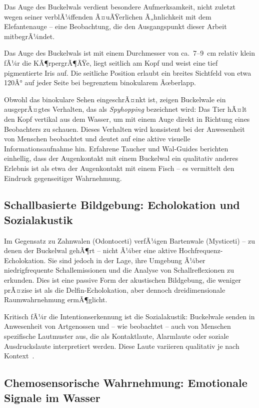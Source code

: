 ﻿\documentclass[12pt,a4paper]{article}
\theoremstyle{definition}
\theoremstyle{remark}
\begin{document}
Das Auge des Buckelwals verdient besondere Aufmerksamkeit, nicht zuletzt wegen
seiner verblÃ¼ffenden Ã¤uÃŸerlichen Ã„hnlichkeit mit dem Elefantenauge -- eine
Beobachtung, die den Ausgangspunkt dieser Arbeit mitbegrÃ¼ndet.

Das Auge des Buckelwals ist mit einem Durchmesser von ca.\ 7--9~cm relativ klein
fÃ¼r die KÃ¶rpergrÃ¶ÃŸe, liegt seitlich am Kopf und weist eine tief pigmentierte
Iris auf. Die seitliche Position erlaubt ein breites Sichtfeld von etwa 120Â°
auf jeder Seite bei begrenztem binokularem Ãœberlapp.

Obwohl das binokulare Sehen eingeschrÃ¤nkt ist, zeigen Buckelwale ein
ausgeprÃ¤gtes Verhalten, das als \emph{Spyhopping} bezeichnet wird: Das
Tier hÃ¤lt den Kopf vertikal aus dem Wasser, um mit einem Auge direkt in
Richtung eines Beobachters zu schauen. Dieses Verhalten wird konsistent bei
der Anwesenheit von Menschen beobachtet und deutet auf eine aktive visuelle
Informationsaufnahme hin. Erfahrene Taucher und Wal-Guides berichten
einhellig, dass der Augenkontakt mit einem Buckelwal ein qualitativ anderes
Erlebnis ist als etwa der Augenkontakt mit einem Fisch -- es vermittelt den
Eindruck gegenseitiger Wahrnehmung.

\subsection{Schallbasierte Bildgebung: Echolokation und Sozialakustik}

Im Gegensatz zu Zahnwalen (Odontoceti) verfÃ¼gen Bartenwale (Mysticeti) --
zu denen der Buckelwal gehÃ¶rt -- nicht Ã¼ber eine aktive Hochfrequenz-Echolokation.
Sie sind jedoch in der Lage, ihre Umgebung Ã¼ber niedrigfrequente Schallemissionen
und die Analyse von Schallreflexionen zu erkunden. Dies ist eine passive Form
der akustischen Bildgebung, die weniger prÃ¤zise ist als die Delfin-Echolokation,
aber dennoch dreidimensionale Raumwahrnehmung ermÃ¶glicht.

Kritisch fÃ¼r die Intentionserkennung ist die Sozialakustik: Buckelwale senden
in Anwesenheit von Artgenossen und -- wie beobachtet -- auch von Menschen
spezifische Lautmuster aus, die als Kontaktlaute, Alarmlaute oder soziale
Ausdruckslaute interpretiert werden. Diese Laute variieren qualitativ je nach
Kontext~\cite{dunlop2008social}.

\subsection{Chemosensorische Wahrnehmung: Emotionale Signale im Wasser}
\end{document}
